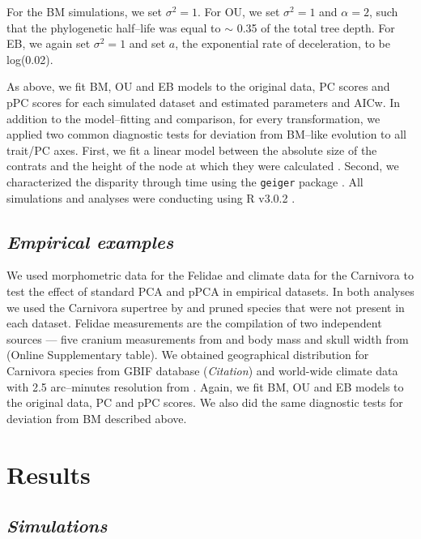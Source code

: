 \documentclass[a4paper,12pt]{article}
\begin{document}
For the BM simulations, we set $\sigma^2=\text{1}$. For OU, we set $\sigma^2=\text{1}$ and $\alpha=\text{2}$, such that the phylogenetic half--life \citep[log(2)/$\alpha$;][]{Hansen2008} was equal to $\sim$ 0.35 of the total tree depth. For EB, we again set $\sigma^2=\text{1}$ and set $a$, the exponential rate of deceleration, to be log(0.02). 

As above, we fit BM, OU and EB models to the original data, PC scores and pPC scores for each simulated dataset and estimated parameters and AICw. In addition to the model--fitting and comparison, for every transformation, we applied two common diagnostic tests for deviation from BM--like evolution to all trait/PC axes. First, we fit a linear model between the absolute size of the contrats \citep{Felsenstein1985} and the height of the node at which they were calculated \citep[i.e., the ``node height test'' of][]{FreckletonHarvey2006}. Second, we characterized the disparity through time \citep{Harmon2003} using the \texttt{geiger} package \citep{geiger2}. All simulations and analyses were conducting using R v3.0.2 \citep{R}.


\subsection{\emph{Empirical examples}}
We used morphometric data for the Felidae and climate data for the Carnivora to test the effect of standard PCA and pPCA in empirical datasets. In both analyses we used the Carnivora supertree by \cite{Nyakatura_2012} and pruned species that were not present in each dataset. Felidae measurements are the compilation of two independent sources --- five cranium measurements from \cite{slater_2009} and body mass and skull width from \cite{sakamoto_2010} (Online Supplementary table). We obtained geographical distribution for Carnivora species from GBIF database (\textit{Citation}) and world-wide climate data with 2.5 arc--minutes resolution from \cite{hijmans_2005}. Again, we fit BM, OU and EB models to the original data, PC and pPC scores. We also did the same diagnostic tests for deviation from BM described above.

\section{Results}
\subsection{\emph{Simulations}}
\end{document}
